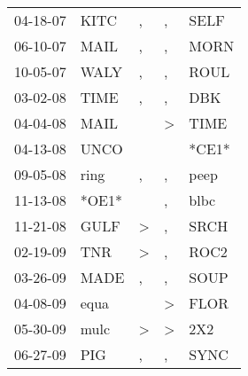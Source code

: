\begin{supertabular}{p{0.07\textwidth}p{0.06\textwidth}p{0.02\textwidth}p{0.02\textwidth}p{0.06\textwidth}}
          04-18-07\textsuperscript{} &           KITC\textsuperscript{} &                , &                , &           SELF\textsuperscript{} \\
          06-10-07\textsuperscript{} &           MAIL\textsuperscript{} &                , &                , &           MORN\textsuperscript{} \\
          10-05-07\textsuperscript{} &           WALY\textsuperscript{} &                , &                , &           ROUL\textsuperscript{} \\
          03-02-08\textsuperscript{} &           TIME\textsuperscript{} &                , &                , &            DBK\textsuperscript{} \\
          04-04-08\textsuperscript{} &           MAIL\textsuperscript{} &                  &     \textgreater &           TIME\textsuperscript{} \\
          04-13-08\textsuperscript{} &           UNCO\textsuperscript{} &                  &                  &                            *CE1* \\
          09-05-08\textsuperscript{} &           ring\textsuperscript{} &                , &                , &           peep\textsuperscript{} \\
          11-13-08\textsuperscript{} &                            *OE1* &                  &                , &           blbc\textsuperscript{} \\
          11-21-08\textsuperscript{} &           GULF\textsuperscript{} &     \textgreater &                , &           SRCH\textsuperscript{} \\
          02-19-09\textsuperscript{} &            TNR\textsuperscript{} &     \textgreater &                , &           ROC2\textsuperscript{} \\
          03-26-09\textsuperscript{} &           MADE\textsuperscript{} &                , &                , &           SOUP\textsuperscript{} \\
          04-08-09\textsuperscript{} &           equa\textsuperscript{} &                  &     \textgreater &           FLOR\textsuperscript{} \\
          05-30-09\textsuperscript{} &           mulc\textsuperscript{} &     \textgreater &     \textgreater &            2X2\textsuperscript{} \\
          06-27-09\textsuperscript{} &            PIG\textsuperscript{} &                , &                , &           SYNC\textsuperscript{} \\

\end{supertabular}
